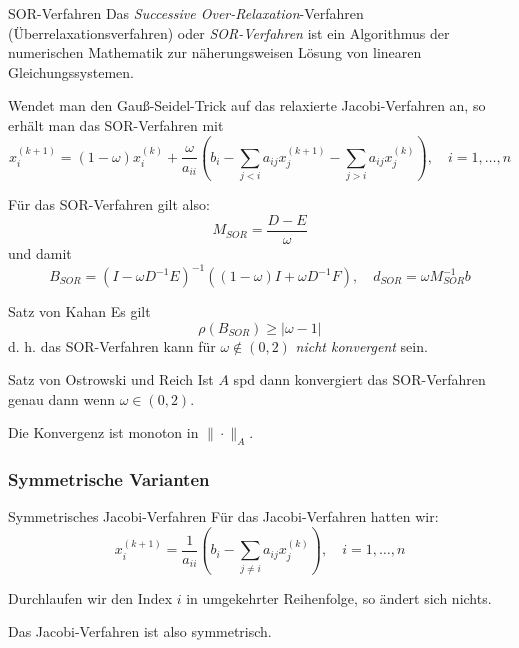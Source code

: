 \begin{defi}{SOR-Verfahren}
    Das \emph{Successive Over-Relaxation}-Verfahren (Überrelaxationsverfahren) oder \emph{SOR-Verfahren} ist ein Algorithmus der numerischen Mathematik zur näherungsweisen Lösung von linearen Gleichungssystemen.

    Wendet man den Gauß-Seidel-Trick auf das relaxierte Jacobi-Verfahren an, so erhält man das SOR-Verfahren mit
    \[
        x_i^{(k+1)} = (1 - \omega) x_i^{(k)} + \frac{\omega}{a_{ii}} \left( b_i - \sum_{j < i} a_{ij} x_j^{(k+1)} - \sum_{j > i} a_{ij} x_j^{(k)} \right), \quad i = 1, \ldots, n
    \]

    Für das SOR-Verfahren gilt also:
    \[
        M_{SOR} = \frac{D - E}{\omega}
    \]
    und damit
    \[
        B_{SOR} = (I - \omega D^{-1}E)^{-1} ((1 - \omega) I + \omega D^{-1} F), \quad d_{SOR} = \omega M_{SOR}^{-1} b
    \]
\end{defi}

\begin{defi}{Satz von Kahan}
    Es gilt
    \[
        \rho(B_{SOR}) \geq |\omega - 1|
    \]
    d. h. das SOR-Verfahren kann für $\omega \notin (0, 2)$ \emph{nicht konvergent} sein.
\end{defi}

\begin{defi}{Satz von Ostrowski und Reich}
    Ist $A$ spd dann konvergiert das SOR-Verfahren genau dann wenn $\omega \in (0, 2)$.

    Die Konvergenz ist monoton in $\| \cdot \|_A$.
\end{defi}

\subsubsection{Symmetrische Varianten}

\begin{bonus}{Symmetrisches Jacobi-Verfahren}
    Für das Jacobi-Verfahren hatten wir:
    \[
        x_i^{(k+1)} = \frac{1}{a_{ii}} \left( b_i - \sum_{j \neq i} a_{ij} x_j^{(k)} \right), \quad i = 1, \ldots, n
    \]

    Durchlaufen wir den Index $i$ in umgekehrter Reihenfolge, so ändert sich nichts.

    Das Jacobi-Verfahren ist also symmetrisch.
\end{bonus}

